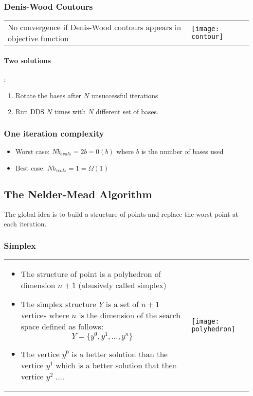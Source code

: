 \subsubsection{Denis-Wood Coutours}

\begin{tabular}{m{12cm}m{5cm}}
No convergence if Denis-Wood contours appears in objective
function
&
\texttt{[image: contour]}
\end{tabular}

\paragraph{Two solutions}:
\begin{enumerate}
    \item Rotate the bases after $N$ unsuccessful iterations
    \item Run DDS $N$ times with $N$ different set of bases.
    \end{enumerate}

\subsubsection{One iteration complexity}
\begin{itemize}
    \item Worst case: $Nb_{evals} = 2b = 0(b)$ where $b$ is the number
        of bases used
    \item Best case: $Nb_{evals} = 1 = \Omega(1)$
\end{itemize}


\subsection{The Nelder-Mead Algorithm}

The global idea is to build a structure of points and replace the worst
point at each iteration.

\subsubsection{Simplex}
\begin{tabular}{m{12cm}m{3cm}}
    \begin{itemize}
        \item The structure of point is a polyhedron of dimension $n+1$
            (abusively called simplex)

    \item The simplex structure $Y$ is a set of $n+1$ vertices where $n$ is the
dimension of the search space defined as follows:
$$Y = \{y^0,y^1,...,y^n\}$$

\item The vertice $y^0$ is a better solution than the vertice $y^1$ which is a better solution that then vertice $y^2$ ....
        \end{itemize}
&
\texttt{[image: polyhedron]}
\end{tabular}

